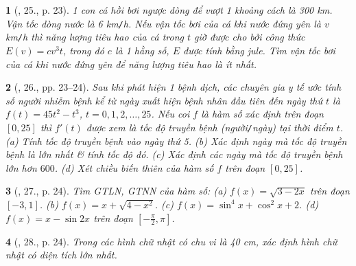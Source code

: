 \documentclass{article}
\newtheorem{baitoan}{}
\begin{document}
\begin{baitoan}[\cite{SGK_Toan_12_giai_tich_nang_cao}, 25., p. 23]
	1 con cá hồi bơi ngược dòng để vượt 1 khoảng cách là {\rm300 km}. Vận tốc dòng nước là {\rm6 km{\tt/}h}. Nếu vận tốc bơi của cá khi nước đứng yên là $v$ {\rm km{\tt/}h} thì năng lượng tiêu hao của cá trong $t$ giờ được cho bởi công thức $E(v) = cv^3t$, trong đó $c$ là 1 hằng số, $E$ được tính bằng jule. Tìm vận tốc bơi của cá khi nước đứng yên để năng lượng tiêu hao là ít nhất.
\end{baitoan}

\begin{baitoan}[\cite{SGK_Toan_12_giai_tich_nang_cao}, 26., pp. 23--24]
	Sau khi phát hiện 1 bệnh dịch, các chuyên gia y tế ước tính số người nhiễm bệnh kể từ ngày xuất hiện bệnh nhân đầu tiên đến ngày thứ $t$ là $f(t) = 45t^2 - t^3$, $t = 0,1,2,\ldots,25$. Nếu coi $f$ là hàm số xác định trên đoạn $[0,25]$ thì $f'(t)$ được xem là tốc độ truyền bệnh (người{\tt/}ngày) tại thời điểm $t$. (a) Tính tốc độ truyền bệnh vào ngày thứ 5. (b) Xác định ngày mà tốc độ truyền bệnh là lớn nhất \& tính tốc độ đó. (c) Xác định các ngày mà tốc độ truyền bệnh lớn hơn $600$. (d) Xét chiều biến thiên của hàm số $f$ trên đoạn $[0,25]$.
\end{baitoan}

\begin{baitoan}[\cite{SGK_Toan_12_giai_tich_nang_cao}, 27., p. 24]
	Tìm {\rm GTLN, GTNN} của hàm số: (a) $f(x) = \sqrt{3 - 2x}$ trên đoạn $[-3,1]$. (b) $f(x) = x + \sqrt{4 - x^2}$. (c) $f(x) = \sin^4x + \cos^2x + 2$. (d) $f(x) = x - \sin2x$ trên đoạn $\left[-\frac{\pi}{2},\pi\right]$.
\end{baitoan}

\begin{baitoan}[\cite{SGK_Toan_12_giai_tich_nang_cao}, 28., p. 24]
	Trong các hình chữ nhật có chu vi là {\rm40 cm}, xác định hình chữ nhật có diện tích lớn nhất.
\end{baitoan}

\end{document}

